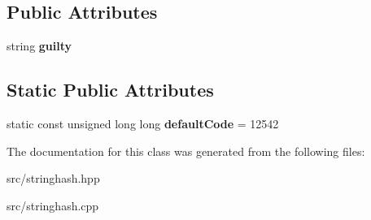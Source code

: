 \subsection*{Public Attributes}
\begin{DoxyCompactItemize}
\item 
\mbox{\label{classDataJuggler_1_1StringHashOverflowEx_aa1eacc7cf8dfaf161bc8287882b886d8}} 
string {\bfseries guilty}
\end{DoxyCompactItemize}
\subsection*{Static Public Attributes}
\begin{DoxyCompactItemize}
\item 
\mbox{\label{classDataJuggler_1_1StringHashOverflowEx_a8ccbc125218a45e4782d4e2379eae332}} 
static const unsigned long long {\bfseries default\+Code} = 12542
\end{DoxyCompactItemize}


The documentation for this class was generated from the following files\+:\begin{DoxyCompactItemize}
\item 
src/stringhash.\+hpp\item 
src/stringhash.\+cpp\end{DoxyCompactItemize}
